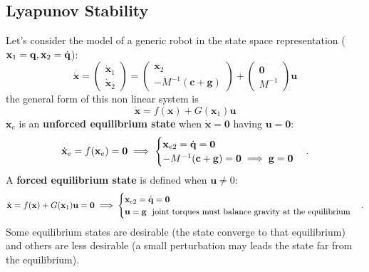 \documentclass[10pt, a4paper]{report}
\newcommand{\q}{{\mathbf q}}
\begin{document}
\subsection{Lyapunov Stability}
Let's consider the model of a generic robot in the state space representation ($\mathbf x_1=\q,\mathbf x_2=\dq$):\begin{equation}
    \dot{\mathbf x}=\begin{pmatrix}
        \dot{\mathbf x}_1\\\dot{\mathbf x}_2
    \end{pmatrix}=\begin{pmatrix}
        \mathbf x_2\\ 
        -M^{-1}(\mathbf c+\mathbf g)
    \end{pmatrix}+\begin{pmatrix}
        \mathbf 0\\  M^{-1}
    \end{pmatrix}\mathbf u
\end{equation}
the general form of this non linear system is\begin{equation}
    \dot{\mathbf x}=f(\mathbf x)+G(\mathbf x_1)\mathbf u
\end{equation}
$\mathbf x_e$ is an \textbf{unforced equilibrium state} when $\dot{\mathbf x}=\mathbf 0$ having $\mathbf u=\mathbf 0$:\begin{equation}
     \dot{\mathbf x}_e=f(\mathbf x_e)=\mathbf 0\implies\begin{cases}
        \mathbf x_{e2}={\dot{\mathbf q}}=\mathbf 0\\
        -M^{-1}(\mathbf c+\mathbf g)=\mathbf 0\implies \mathbf g=\mathbf 0
     \end{cases}.
\end{equation}
A \textbf{forced equilibrium state} is defined when $\mathbf u\ne 0$:\begin{equation}
    \dot{\mathbf x}=f(\mathbf x)+G(\mathbf x_1)\mathbf u=\mathbf 0\implies\begin{cases}
        \mathbf x_{e2}={\dot{\mathbf q}}=\mathbf 0\\
        \mathbf u=\mathbf g \  \text{ joint torques must balance gravity
at the equilibrium}
    \end{cases}.
\end{equation}
Some equilibrium states are desirable (the state converge to that equilibrium) and others are less desirable (a small perturbation may leads the state far from the equilibrium).\bigskip
\end{document}

